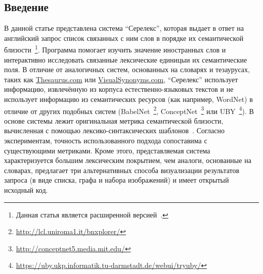 \documentclass[a4paper,10pt,twoside]{article}
\begin{document}

\author{Панченко А.И.${}^{1,2}$, Романов П.В.${}^2$, Романов А.В${}^1$, \linebreak Филиппович А.Ю.${}^2$, Филиппович Ю.Н.${}^2$, Морозова О.И.${}^1$}




\subsection{Введение}

В данной статье представлена система "`Серелекс"', которая выдает в ответ на английский запрос список связанных с ним слов в порядке их семантической близости~\footnote{Данная статья является расширенной версией~\cite{panchenko2013serelex}.}. Программа помогает изучить значение иностранных слов и интерактивно исследовать связанные лексические единицыи их семантические поля. В отличие от аналогичных систем, основанных на словарях и тезаурусах, таких как \url{Thesaurus.com} или \url{VisualSynonyms.com}, "`Серелекс"' использует информацию, извлечённую из корпуса естественно-языковых текстов и не использует информацию из семантических ресурсов (как например, WordNet) в отличие от других подобных систем (BabelNet~\footnote{ \url{http://lcl.uniroma1.it/bnxplorer/}}, ConceptNet~\footnote{ \url{http://conceptnet5.media.mit.edu/}} или UBY~\footnote{\url{https://uby.ukp.informatik.tu-darmstadt.de/webui/tryuby/}}). В основе системы лежит оригинальная метрика семантической близости, вычисленная с помощью лексико-синтаксических шаблонов~\cite{panchenko2012konvens}. Согласно экспериментам, точность использованного подхода сопоставима с существующими метриками. Кроме этого, представляемая система характеризуется большим лексическим покрытием, чем аналоги, основанные на словарах, предлагает три альтернативных способа визуализации результатов запроса (в виде списка, графа и набора изображений) и имеет открытый исходный код.
\end{document}
